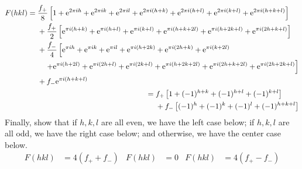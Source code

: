 \documentclass[../psets.tex]{subfiles}
\begin{document}
\begin{enumerate}[label={\textbf{31-\arabic*.}},leftmargin=3.5em]
\begin{align*}
        \begin{split}
            F(hkl) ={}& \frac{f_+}{8}\left[ 1+\e[2\pi ih]+\e[2\pi ik]+\e[2\pi il]+\e[2\pi i(h+k)]+\e[2\pi i(h+l)]+\e[2\pi i(k+l)]+\e[2\pi i(h+k+l)] \right]\\
            &+ \frac{f_+}{2}\left[ \e[\pi i(h+k)]+\e[\pi i(h+l)]+\e[\pi i(k+l)]+\e[\pi i(h+k+2l)]+\e[\pi i(h+2k+l)]+\e[\pi i(2h+k+l)] \right]\\
            &+ \frac{f_-}{4}\left[ \e[\pi ih]+\e[\pi ik]+\e[\pi il]+\e[\pi i(h+2k)]+\e[\pi i(2h+k)]+\e[\pi i(k+2l)] \right.\\
            &\quad \left. +\e[\pi i(h+2l)]+\e[\pi i(2h+l)]+\e[\pi i(2k+l)]+\e[\pi i(h+2k+2l)]+\e[\pi i(2h+k+2l)]+\e[\pi i(2h+2k+l)] \right]\\
            &+ f_-\e[\pi i(h+k+l)]
        \end{split}\\
        \begin{split}
            ={}& f_+\left[ 1+(-1)^{h+k}+(-1)^{h+l}+(-1)^{k+l} \right]\\
            &+ f_-\left[ (-1)^h+(-1)^k+(-1)^l+(-1)^{h+k+l} \right]
        \end{split}
    \end{align*}
    Finally, show that if $h,k,l$ are all even, we have the left case below; if $h,k,l$ are all odd, we have the right case below; and otherwise, we have the center case below.
    \begin{align*}
        F(hkl) &= 4(f_++f_-)&
        F(hkl) &= 0&
        F(hkl) &= 4(f_+-f_-)
    \end{align*}
\end{enumerate}
\end{document}
